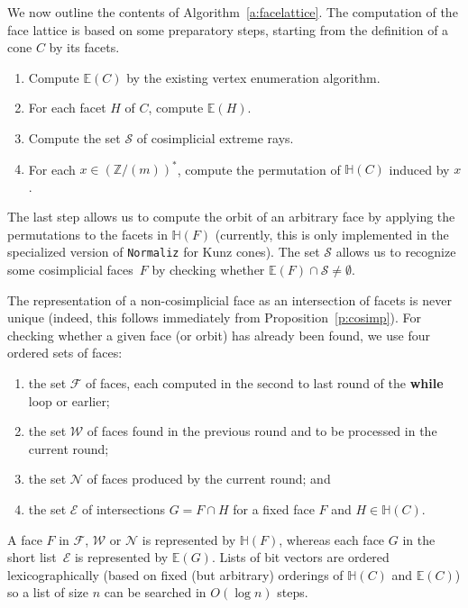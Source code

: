 \documentclass[12pt]{amsart}
\theoremstyle{definition}
\numberwithin{equation}{section}
\newcommand{\ring}[1]{\ensuremath{\mathbb{#1}}}
\renewcommand\>{\rangle}
\newcommand\<{\langle}
\newcommand\0{\mathbf{0}}
\newcommand\ZZ{\ring{Z}}
\newcommand\cW{{\mathcal W}}
\def\EE{{\mathbb E}}
\def\HH{{\mathbb H}}
\def\cF{{\mathcal F}}
\def\cN{{\mathcal N}}
\def\cS{{\mathcal S}}
\def\cE{{\mathcal E}}
\begin{document}
We now outline the contents of Algorithm~\ref{a:facelattice}.  The computation of the face lattice is based on some preparatory steps, starting from the definition of a cone $C$ by its facets.
\begin{enumerate}[(1)]
\item
Compute $\EE(C)$ by the existing vertex enumeration algorithm.

\item
For each facet $H$ of $C$, compute $\EE(H)$.

\item
Compute the set $\cS$ of cosimplicial extreme rays. 

\item
For each $x\in(\ZZ/(m))^*$, compute the permutation of $\HH(C)$ induced by $x$.

\end{enumerate}
The last step allows us to compute the orbit of an arbitrary face by applying the permutations to the facets in $\HH(F)$ (currently, this is only implemented in the specialized version of \texttt{Normaliz} for Kunz cones). The set $\cS$ allows us to recognize some cosimplicial faces~$F$ by checking whether $\EE(F) \cap \cS\neq \emptyset$.

The representation of a non-cosimplicial face as an intersection of facets is never unique (indeed, this follows immediately from Proposition~\ref{p:cosimp}).  For checking whether a given face (or orbit) has already been found, we use four ordered sets of faces:
\begin{enumerate}[(1)]
\item
the set $\cF$ of faces, each computed in the second to last round of the \textbf{while} loop or earlier;

\item
the set $\cW$ of faces found in the previous round and to be processed in the current round;

\item
the set $\cN$ of faces produced by the current round; and

\item
the set $\cE$ of intersections $G = F \cap H$ for a fixed face $F$ and $H \in \HH(C)$.

\end{enumerate}
A face $F$ in $\cF$, $\cW$ or $\cN$ is represented by $\HH(F)$, whereas each face $G$ in the short list~$\cE$ is represented by $\EE(G)$.  Lists of bit vectors are ordered lexicographically (based on fixed (but arbitrary) orderings of $\HH(C)$ and $\EE(C)$) so a list of size $n$ can be searched in $O(\log n)$ steps.  
\end{document}
